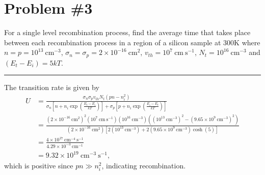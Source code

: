 \documentclass{article}
\newcommand{\horline}
           {\begin{center}
              \noindent\rule{8cm}{0.4pt}
            \end{center}}
\begin{document}
%
%

\pagebreak

\section*{Problem \#3}
For a single level recombination process, find the average time that takes 
place between each recombination process in a region of a silicon
sample at 300K where $n = p = 10^{13} ~\mathrm{cm}^{-3}$,
$\sigma_n = \sigma_p = 2 \times 10^{-16} ~\mathrm{cm}^2$, 
$v_{th} = 10^{7} ~\mathrm{cm} ~\mathrm{s}^{-1}$, 
$N_t = 10^{16} ~\mathrm{cm}^{-3}$ and $(E_t - E_i) = 5 kT$.
\horline
The transition rate is given by
\begin{align*}
  U &= \frac{\sigma_n \sigma_p v_{th} N_t(pn - n_i^2)}
           {\sigma_n \left[n + n_i \exp\left(\frac{E_t - E_i}{kT}\right)\right]
          + \sigma_p \left[p + n_i \exp\left(\frac{E_i - E_t}{kT}\right)\right]} \\
    &= \frac{(2 \times 10^{-16} ~\mathrm{cm}^2)^2 
             (10^7 ~\mathrm{cm}~\mathrm{s}^{-1})
             (10^{16} ~\mathrm{cm}^{-3})
             ((10^{13} ~\mathrm{cm}^{-3})^2 - (9.65 \times 10^9 ~\mathrm{cm}^{-3})^2)}
            {(2 \times 10^{-16} ~\mathrm{cm}^2)
             \left[2(10^{13} ~\mathrm{cm}^{-3}) 
           + 2(9.65 \times 10^9 ~\mathrm{cm}^{-3})\cosh(5)\right]} \\
          &= \frac{4 \times 10^{17} 
                    ~\mathrm{cm}^{-4} ~\mathrm{s}^{-1}}
                  {4.29 \times 10^{-3} ~\mathrm{cm}^{-1}} \\
          &= 9.32 \times 10^{19} ~\mathrm{cm}^{-3} ~\mathrm{s}^{-1},
\end{align*}
which is positive since $pn \gg n_i^2$, indicating recombination. 
\end{document}

